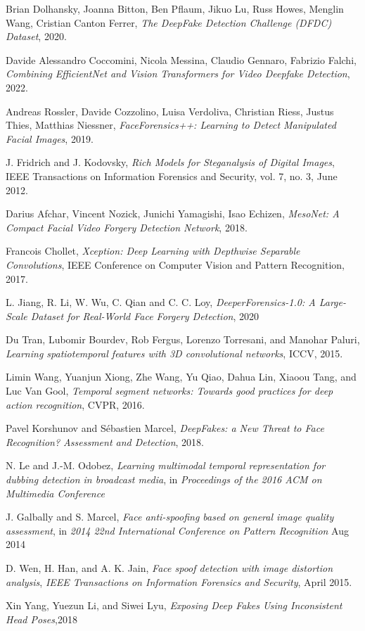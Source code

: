 \documentclass{article} %
\begin{document}
\begin{thebibliography}{9}

Brian Dolhansky, Joanna Bitton, Ben Pflaum, Jikuo Lu, Russ Howes, Menglin Wang, Cristian Canton Ferrer, 
\emph{The DeepFake Detection Challenge (DFDC) Dataset}, 
2020.

Davide Alessandro Coccomini, Nicola Messina, Claudio Gennaro, Fabrizio Falchi, 
\emph{Combining EfficientNet and Vision Transformers for Video Deepfake Detection}, 
2022.

Andreas Rossler, Davide Cozzolino, Luisa Verdoliva, Christian Riess, Justus Thies, Matthias Niessner, 
\emph{FaceForensics++: Learning to Detect Manipulated Facial Images}, 
2019.

J. Fridrich and J. Kodovsky, 
\emph{Rich Models for Steganalysis of Digital Images}, 
IEEE Transactions on Information Forensics and Security, vol. 7, no. 3, June 2012.

Darius Afchar, Vincent Nozick, Junichi Yamagishi, Isao Echizen, 
\emph{MesoNet: A Compact Facial Video Forgery Detection Network}, 
2018.

Francois Chollet, 
\emph{Xception: Deep Learning with Depthwise Separable Convolutions}, 
IEEE Conference on Computer Vision and Pattern Recognition, 2017.

L. Jiang, R. Li, W. Wu, C. Qian and C. C. Loy, 
\emph{DeeperForensics-1.0: A Large-Scale Dataset for Real-World Face Forgery Detection}, 2020

Du Tran, Lubomir Bourdev, Rob Fergus, Lorenzo Torresani, and Manohar Paluri, 
\emph{Learning spatiotemporal features with 3D convolutional networks}, 
ICCV, 2015.

Limin Wang, Yuanjun Xiong, Zhe Wang, Yu Qiao, Dahua Lin, Xiaoou Tang, and Luc Van Gool, 
\emph{Temporal segment networks: Towards good practices for deep action recognition}, 
CVPR, 2016.

Pavel Korshunov and S{\'{e}}bastien Marcel, 
\emph{DeepFakes: a New Threat to Face Recognition? Assessment and Detection}, 
2018.

N. Le and J.-M. Odobez, 
\emph{Learning multimodal temporal representation for dubbing detection in broadcast media}, 
in \emph{Proceedings of the 2016 ACM on Multimedia Conference}

J. Galbally and S. Marcel, 
\emph{Face anti-spoofing based on general image quality assessment}, 
in \emph{2014 22nd International Conference on Pattern Recognition}
Aug 2014

D. Wen, H. Han, and A. K. Jain, 
\emph{Face spoof detection with image distortion analysis}, 
\emph{IEEE Transactions on Information Forensics and Security}, 
April 2015.

Xin Yang, Yuezun Li, and Siwei Lyu,
\emph{Exposing Deep Fakes Using Inconsistent Head Poses},2018


\end{thebibliography}
\end{document}
